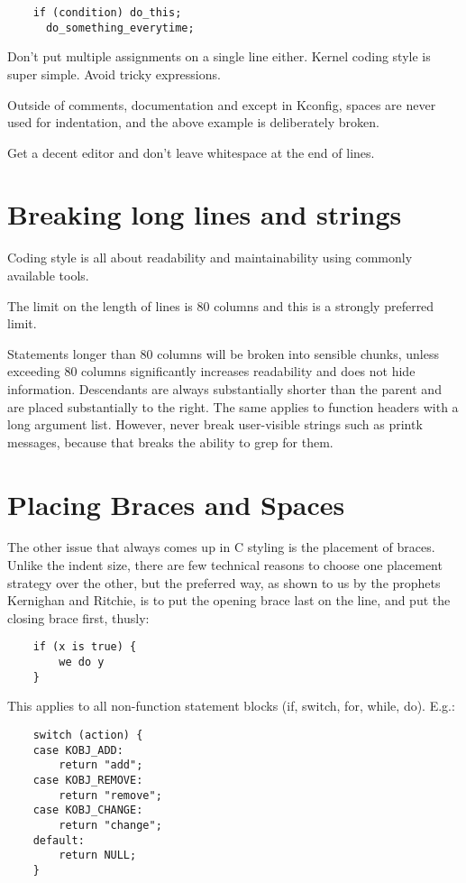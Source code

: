 \documentclass[pdftex,12pt, twocol]{article} %
\begin{document}
\begin{verbatim}
	if (condition) do_this;
	  do_something_everytime;
\end{verbatim}

Don't put multiple assignments on a single line either.  Kernel coding style
is super simple.  Avoid tricky expressions.

Outside of comments, documentation and except in Kconfig, spaces are never
used for indentation, and the above example is deliberately broken.

Get a decent editor and don't leave whitespace at the end of lines.


\section{Breaking long lines and strings}

Coding style is all about readability and maintainability using commonly
available tools.

The limit on the length of lines is 80 columns and this is a strongly
preferred limit.

Statements longer than 80 columns will be broken into sensible chunks, unless
exceeding 80 columns significantly increases readability and does not hide
information. Descendants are always substantially shorter than the parent and
are placed substantially to the right. The same applies to function headers
with a long argument list. However, never break user-visible strings such as
printk messages, because that breaks the ability to grep for them.


\section{Placing Braces and Spaces}

The other issue that always comes up in C styling is the placement of
braces.  Unlike the indent size, there are few technical reasons to
choose one placement strategy over the other, but the preferred way, as
shown to us by the prophets Kernighan and Ritchie, is to put the opening
brace last on the line, and put the closing brace first, thusly:

\begin{verbatim}
	if (x is true) {
		we do y
	}
\end{verbatim}

This applies to all non-function statement blocks (if, switch, for,
while, do).  E.g.:

\begin{verbatim}
	switch (action) {
	case KOBJ_ADD:
		return "add";
	case KOBJ_REMOVE:
		return "remove";
	case KOBJ_CHANGE:
		return "change";
	default:
		return NULL;
	}
\end{verbatim}
\end{document}
